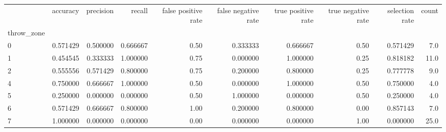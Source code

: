 \begin{tabular}{lrrrrrrrrr}
\toprule
{} &  accuracy &  precision &    recall &  false positive rate &  false negative rate &  true positive rate &  true negative rate &  selection rate &  count \\
throw\_zone &           &            &           &                      &                      &                     &                     &                 &        \\
\midrule
0          &  0.571429 &   0.500000 &  0.666667 &                 0.50 &             0.333333 &            0.666667 &                0.50 &        0.571429 &    7.0 \\
1          &  0.454545 &   0.333333 &  1.000000 &                 0.75 &             0.000000 &            1.000000 &                0.25 &        0.818182 &   11.0 \\
2          &  0.555556 &   0.571429 &  0.800000 &                 0.75 &             0.200000 &            0.800000 &                0.25 &        0.777778 &    9.0 \\
4          &  0.750000 &   0.666667 &  1.000000 &                 0.50 &             0.000000 &            1.000000 &                0.50 &        0.750000 &    4.0 \\
5          &  0.250000 &   0.000000 &  0.000000 &                 0.50 &             1.000000 &            0.000000 &                0.50 &        0.250000 &    4.0 \\
6          &  0.571429 &   0.666667 &  0.800000 &                 1.00 &             0.200000 &            0.800000 &                0.00 &        0.857143 &    7.0 \\
7          &  1.000000 &   0.000000 &  0.000000 &                 0.00 &             0.000000 &            0.000000 &                1.00 &        0.000000 &   25.0 \\
\bottomrule
\end{tabular}
